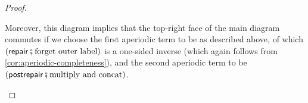 \begin{proof}
\begin{description}
        Moreover, this diagram implies that the top-right face of the main diagram commutes if we choose the first aperiodic term to be as described above, of which $(\repairterm \comp \text{forget outer label})$ is a one-sided inverse (which again follows from \cref{cor:aperiodic-completeness}), and the second aperiodic term to be $(\postrepairterm \comp \text{multiply and concat})$.
    \end{description}
\end{proof}